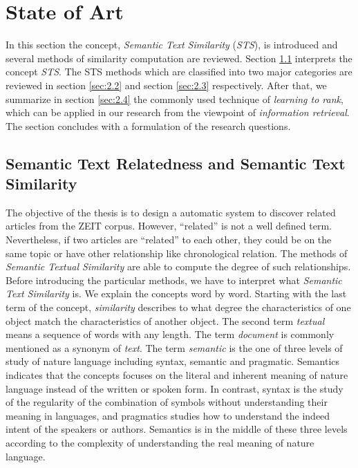 \section{State of Art}
\label{sec:2}

In this section the concept, \textit{Semantic Text Similarity} (\textit{STS}), is introduced and several methods of similarity computation are reviewed. Section \ref{sec:2.1} interprets the concept \textit{STS}. The STS methods which are classified into two major categories are reviewed in section \ref{sec:2.2} and section \ref{sec:2.3} respectively. After that, we summarize in section \ref{sec:2.4} the commonly used technique of \textit{learning to rank}, which can be applied in our research from the viewpoint of \textit{information retrieval}. The section concludes with a formulation of the research questions. 

\bigbreak
\subsection{Semantic Text Relatedness and Semantic Text Similarity}
\label{sec:2.1}

The objective of the thesis is to design a automatic system to discover related articles from the ZEIT corpus. However, ``related'' is not a well defined term. Nevertheless, if two articles are ``related'' to each other, they could be on the same topic or have other relationship like chronological relation. The methods of \textit{Semantic Textual Similarity} are able to compute the degree of such relationships. Before introducing the particular methods, we have to interpret what \textit{Semantic Text Similarity} is. We explain the concepts word by word. Starting with the last term of the concept, \textit{similarity} describes to what degree the characteristics of one object match the characteristics of another object. The second term \textit{textual} means a sequence of words with any length. The term \textit{document} is commonly mentioned as a synonym of \textit{text}. The term \textit{semantic} is the one of three levels of study of nature language including syntax, semantic and pragmatic. Semantics indicates that the concepts focuses on the literal and inherent meaning of nature language instead of the written or spoken form. In contrast, syntax is the study of the regularity of the combination of symbols without understanding their meaning in languages, and pragmatics studies how to understand the indeed intent of the speakers or authors. Semantics is in the middle of these three levels according to the complexity of understanding the real meaning of nature language. 


